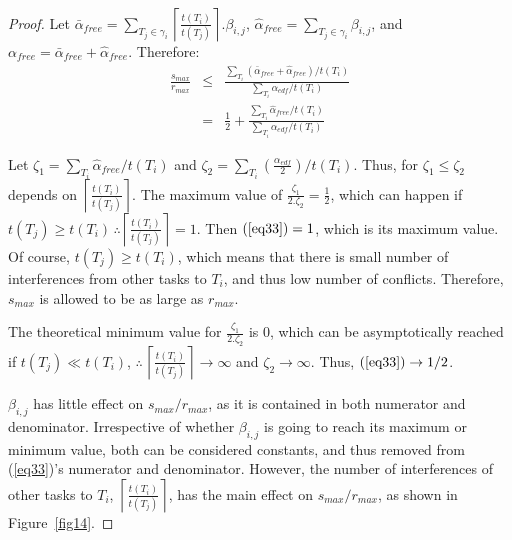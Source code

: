\documentclass[a4paper,english]{article}
\newtheorem{proof}{Proof}
\begin{document}
\begin{proof}
Let $\bar{\alpha}_{free}=\sum_{T_{j}\in\gamma_{i}}\left\lceil\frac{t\left(T_{i}\right)}{t\left(T_{j}\right)}\right\rceil.\beta_{i,j}$,  $\hat{\alpha}_{free}=\sum_{T_{j}\in\gamma_{i}}\beta_{i,j}$, and $\alpha_{free}=\bar{\alpha}_{free}+\hat{\alpha}_{free}.$ Therefore: 
\begin{eqnarray}
\frac{s_{max}}{r_{max}} & \le & \frac{\sum_{T_{i}}(\bar{\alpha}_{free} +\hat{\alpha}_{free})/t(T_{i})}{\sum_{T_{i}}\alpha_{edf}/t(T_{i})}\nonumber \\
 & = & \frac{1}{2}+\frac{\sum_{T_{i}}\hat{\alpha}_{free} /t(T_{i})}{\sum_{T_{i}}\alpha_{edf}/t(T_{i})}
 \label{eq33}
 \end{eqnarray}

Let $\zeta_{1}=\sum_{T_{i}}\hat{\alpha}_{free}/t(T_{i})$
and $\zeta_{2}=\sum_{T_{i}}\left(\frac{\alpha_{edf}}{2}\right)/t(T_{i})$. 
Thus, for $\zeta_{1}\le\zeta_{2}$ depends on $\left\lceil\frac{t(T_{i})}{t(T_{j})}\right\rceil$. The maximum value of $\frac{\zeta_{1}}{2.\zeta_{2}}=\frac{1}{2}$, which can happen if $t(T_{j})\ge t(T_{i})\,\therefore\left\lceil\frac{t(T_{i})}{t(T_{j})}\right\rceil=1$. Then $(\ref{eq33})=1$, which is its maximum value. Of course, $t(T_{j})\ge t(T_{i})$, which 
means that there is small number of interferences from other tasks
to $T_{i}$, and thus low number of conflicts. Therefore, $s_{max}$ is
allowed to be as large as $r_{max}$.

The theoretical minimum value for $\frac{\zeta_{1}}{2.\zeta_{2}}$
is $0$, which can be asymptotically reached if $t(T_{j})\ll t(T_{i})$,
$\therefore\,\left\lceil\frac{t(T_{i})}{t(T_{j})}\right\rceil\rightarrow\infty$
and $\zeta_{2}\rightarrow\infty$. Thus, $(\ref{eq33})\rightarrow1/2$.

$\beta_{i,j}$ has little effect on $s_{max}/r_{max}$, 
as it is contained in both numerator and denominator. Irrespective of whether $\beta_{i,j}$ is going to reach its maximum or minimum value, both can be considered constants, and thus removed from (\ref{eq33})'s numerator and denominator. 
However, the number of
interferences of other tasks to $T_{i}$, $\left\lceil\frac{t(T_{i})}{t(T_{j})}\right\rceil$,
has the main effect on $s_{max}/r_{max}$, 
as shown in Figure~\ref{fig14}. 
\end{proof}
\end{document}
